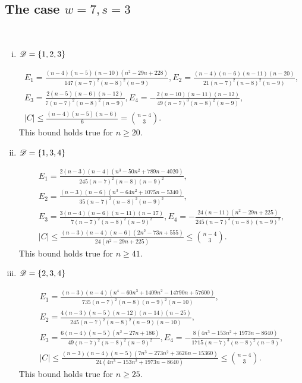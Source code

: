 \documentclass{amsart}
\begin{document}
{\begin{enumerate}[(i)]
\end{enumerate}

\subsection{The case \texorpdfstring{$w=7,s=3$}.}  \label{App:7,3}\hfill\\

\begin{enumerate}[(i)]
\item $\mathscr{D}=\{1,2,3\}$

\begin{gather*}
E_1=\frac{(n-4)(n-5)(n-10)\left(n^2-29n+228\right)}{147(n-7)^2(n-8)^2(n-9)}, E_2=\frac{(n-4)(n-6)(n-11)(n-20)}{21(n-7)^2(n-8)^2(n-9)},\\ 
E_3=\frac{2(n-5)(n-6)(n-12)}{7(n-7)^2(n-8)^2(n-9)},
E_4=-\frac{2(n-10)(n-11)(n-12)}{49(n-7)^3(n-8)^2(n-9)},\\
|C|\le \frac{(n-4)(n-5)(n-6)}{6} = \binom{n-4}{3}.
\end{gather*}
This bound holds true for $n\ge 20.$

\item $\mathscr{D}=\{1,3,4\}$

\begin{gather*}
E_1=\frac{2(n-3)(n-4)\left(n^3-50n^2+789n-4020\right)}{245(n-7)^2(n-8)(n-9)^2},\\ E_2=\frac{(n-3)(n-6)\left(n^3-64n^2+1075n-5340\right)}{35(n-7)^2(n-8)^2(n-9)^2},\\ 
E_3=\frac{3(n-4)(n-6)(n-11)(n-17)}{7(n-7)^2(n-8)^2(n-9)^2},
E_4=-\frac{24(n-11)\left(n^2-29n+225\right)}{245(n-7)^3(n-8)(n-9)^2},\\
|C|\le \frac{(n-3)(n-4)(n-6)\left(2n^2-73n+555\right)}{24\left(n^2-29n+225\right)} \leq \binom{n-4}{3}.
\end{gather*}
This bound holds true for $n\ge 41.$

\item $\mathscr{D}=\{2,3,4\}$

\begin{gather*}
E_1=\frac{(n-3)(n-4)\left(n^4-60n^3+1409n^2-14790n+57600\right)}{735(n-7)^2(n-8)(n-9)^2(n-10)},\\ E_2=\frac{4(n-3)(n-5)(n-12)(n-14)(n-25)}{245(n-7)^2(n-8)^2(n-9)(n-10)},\\ 
E_3=\frac{6(n-4)(n-5)\left(n^2-27n+186\right)}{49(n-7)^2(n-8)^2(n-9)^2},
E_4=-\frac{8\left(4n^3-153n^2+1973n-8640\right)}{1715(n-7)^3(n-8)^2(n-9)},\\
|C|\le \frac{(n-3)(n-4)(n-5)\left(7n^3-273n^2+3626n-15360\right)}{24\left(4n^3-153n^2+1973n-8640\right)} \leq \binom{n-4}{3}.
\end{gather*}
This bound holds true for $n\ge 25.$


\end{enumerate}}
\end{document}
